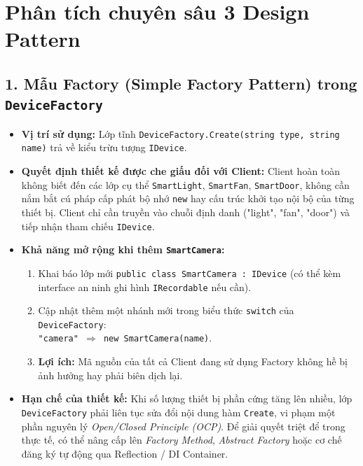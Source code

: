 \documentclass[11pt,a4paper]{article}
\begin{document}
\newpage

\section{Phân tích chuyên sâu 3 Design Pattern}

\subsection{1. Mẫu Factory (Simple Factory Pattern) trong \texttt{DeviceFactory}}
\begin{itemize}[itemsep=1.2pt]
    \item \textbf{Vị trí sử dụng:} Lớp tĩnh \texttt{DeviceFactory.Create(string type, string name)} trả về kiểu trừu tượng \texttt{IDevice}.
    \item \textbf{Quyết định thiết kế được che giấu đối với Client:} Client hoàn toàn không biết đến các lớp cụ thể \texttt{SmartLight}, \texttt{SmartFan}, \texttt{SmartDoor}, không cần nắm bắt cú pháp cấp phát bộ nhớ \texttt{new} hay cấu trúc khởi tạo nội bộ của từng thiết bị. Client chỉ cần truyền vào chuỗi định danh ("light", "fan", "door") và tiếp nhận tham chiếu \texttt{IDevice}.
    \item \textbf{Khả năng mở rộng khi thêm \texttt{SmartCamera}:}
    \begin{enumerate}[itemsep=1.0pt]
        \item Khai báo lớp mới \texttt{public class SmartCamera : IDevice} (có thể kèm interface an ninh ghi hình \texttt{IRecordable} nếu cần).
        \item Cập nhật thêm một nhánh mới trong biểu thức \texttt{switch} của \texttt{DeviceFactory}:\\
        \texttt{"camera" $\Rightarrow$ new SmartCamera(name)}.
        \item \textbf{Lợi ích:} Mã nguồn của tất cả Client đang sử dụng Factory không hề bị ảnh hưởng hay phải biên dịch lại.
    \end{enumerate}
    \item \textbf{Hạn chế của thiết kế:} Khi số lượng thiết bị phần cứng tăng lên nhiều, lớp \texttt{DeviceFactory} phải liên tục sửa đổi nội dung hàm \texttt{Create}, vi phạm một phần nguyên lý \textit{Open/Closed Principle (OCP)}. Để giải quyết triệt để trong thực tế, có thể nâng cấp lên \textit{Factory Method}, \textit{Abstract Factory} hoặc cơ chế đăng ký tự động qua Reflection / DI Container.
\end{itemize}
\end{document}
